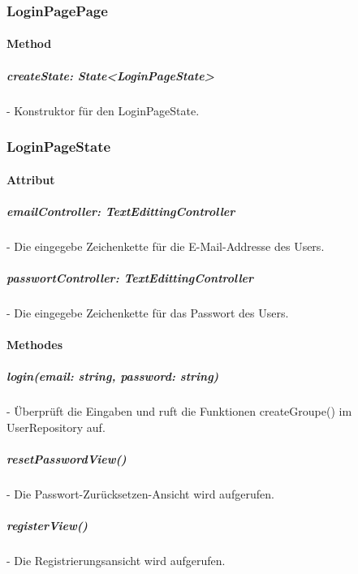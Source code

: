 \documentclass[parskip=full]{scrartcl}
\begin{document}
    \subsubsection{LoginPagePage}
        \paragraph*{Method}
            \subparagraph*{createState: State<LoginPageState>} - Konstruktor für den LoginPageState.
    
    \subsubsection{LoginPageState}
        \paragraph*{Attribut}
            \subparagraph*{emailController: TextEdittingController} - Die eingegebe Zeichenkette für die E-Mail-Addresse des Users.
            \subparagraph*{passwortController: TextEdittingController} - Die eingegebe Zeichenkette für das Passwort des Users.

        \paragraph*{Methodes}

            \subparagraph*{login(email: string, password: string)} - Überprüft die Eingaben und ruft die Funktionen createGroupe() im UserRepository auf.
            \subparagraph*{resetPasswordView()} -  Die Passwort-Zurücksetzen-Ansicht wird aufgerufen.
            \subparagraph*{registerView()} -  Die Registrierungsansicht wird aufgerufen.
\end{document}
